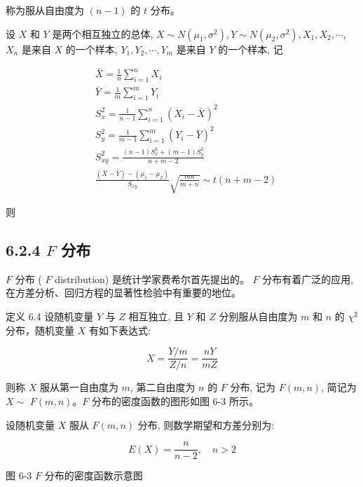 \documentclass[10pt]{article}
\begin{document}
\begin{CJK*}{UTF8}{bsmi}
称为服从自由度为 $(n-1)$ 的 $t$ 分布。

设 $X$ 和 $Y$ 是两个相互独立的总体, $X \sim N\left(\mu_{1}, \sigma^{2}\right), Y \sim N\left(\mu_{2}, \sigma^{2}\right), X_{1}, X_{2}, \cdots$, $X_{n}$ 是来自 $X$ 的一个样本, $Y_{1}, Y_{2}, \cdots, Y_{m}$ 是来自 $Y$ 的一个样本, 记


\begin{align*}
& \bar{X}=\frac{1}{n} \sum_{i=1}^{n} X_{i} \\
& \bar{Y}=\frac{1}{m} \sum_{i=1}^{m} Y_{i} \\
& S_{x}^{2}=\frac{1}{n-1} \sum_{i=1}^{n}\left(X_{i}-\bar{X}\right)^{2} \\
& S_{y}^{2}=\frac{1}{m-1} \sum_{i=1}^{m}\left(Y_{i}-\bar{Y}\right)^{2} \\
& S_{x y}^{2}=\frac{(n-1) S_{x}^{2}+(m-1) S_{y}^{2}}{n+m-2} \\
& \frac{(\bar{X}-\bar{Y})-\left(\mu_{1}-\mu_{2}\right)}{S_{x y}} \sqrt{\frac{m n}{m+n}} \sim t(n+m-2) \tag{6.4}
\end{align*}


则

\subsection*{6.2.4 $F$ 分布}
$F$ 分布 ( $F$ distribution) 是统计学家费希尔首先提出的。 $F$ 分布有着广泛的应用, 在方差分析、回归方程的显著性检验中有重要的地位。

定义 6.4 设随机变量 $Y$ 与 $Z$ 相互独立, 且 $Y$ 和 $Z$ 分别服从自由度为 $m$ 和 $n$ 的 $\chi^{2}$ 分布，随机变量 $X$ 有如下表达式:


\begin{equation*}
X=\frac{Y / m}{Z / n}=\frac{n Y}{m Z} \tag{6.5}
\end{equation*}


则称 $X$ 服从第一自由度为 $m$, 第二自由度为 $n$ 的 $F$ 分布, 记为 $F(m, n)$, 简记为 $X \sim$ $F(m, n) 。 F$ 分布的密度函数的图形如图 6-3 所示。

设随机变量 $X$ 服从 $F(m, n)$ 分布, 则数学期望和方差分别为:


\begin{equation*}
E(X)=\frac{n}{n-2}, \quad n>2 \tag{6.6}
\end{equation*}


\begin{center}
\end{center}

图 6-3 $F$ 分布的密度函数示意图



\end{CJK*}
\end{document}
